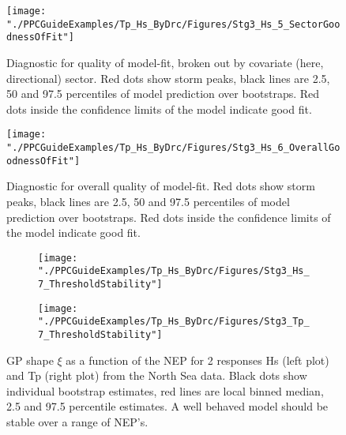 \begin{figure}
	\centering
	\texttt{[image: "./PPCGuideExamples/Tp\_Hs\_ByDrc/Figures/Stg3\_Hs\_5\_SectorGoodnessOfFit"]}
	\caption{Diagnostic for quality of model-fit, broken out by covariate (here, directional) sector. Red dots show storm peaks, black lines are 2.5, 50 and 97.5 percentiles of model prediction over bootstraps. Red dots inside the confidence limits of the model indicate good fit.}
	\label{fig:Stg3_Hs_4_SectorGoodnessOfFit}
\end{figure}

\begin{figure}
	\centering
	\texttt{[image: "./PPCGuideExamples/Tp\_Hs\_ByDrc/Figures/Stg3\_Hs\_6\_OverallGoodnessOfFit"]}
	\caption{Diagnostic for overall quality of model-fit. Red dots show storm peaks, black lines are 2.5, 50 and 97.5 percentiles of model prediction over bootstraps. Red dots inside the confidence limits of the model indicate good fit.}
	\label{fig:Stg3_Hs_5_OverallGoodnessOfFit}
\end{figure}

\vspace{10pt}
\noindent{}
\vspace{10pt}

\begin{figure}
    \centering
    \begin{subfigure}{0.45\textwidth}
	\centering
	\texttt{[image: "./PPCGuideExamples/Tp\_Hs\_ByDrc/Figures/Stg3\_Hs\_7\_ThresholdStability"]}
	    \end{subfigure}
    \begin{subfigure}{0.45\textwidth}
		\texttt{[image: "./PPCGuideExamples/Tp\_Hs\_ByDrc/Figures/Stg3\_Tp\_7\_ThresholdStability"]}
    \end{subfigure}
	\caption{GP shape $\xi$ as a function of the NEP for 2 responses Hs (left plot) and Tp (right plot) from the North Sea data. Black dots show individual bootstrap estimates, red lines are local binned median, 2.5 and 97.5 percentile estimates. A well behaved model should be stable over a range of NEP's.}
	\label{fig:Stg3_Hs_6_ThresholdStability}
\end{figure}

